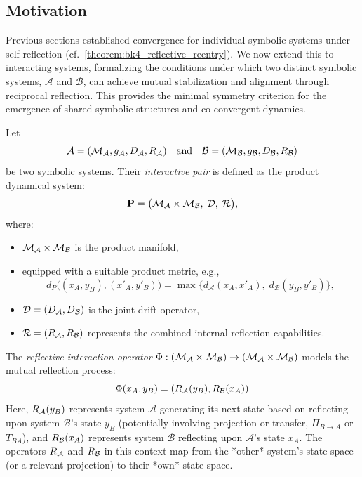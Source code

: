 \subsection{Motivation}
\label{subsec:bk7_motivation}
Previous sections established convergence for individual symbolic systems under self-reflection (cf.~\ref{theorem:bk4_reflective_reentry}). We now extend this to interacting systems, formalizing the conditions under which two distinct symbolic systems, \(\mathcal{A}\) and \(\mathcal{B}\), can achieve mutual stabilization and alignment through reciprocal reflection. This provides the minimal symmetry criterion for the emergence of shared symbolic structures and co-convergent dynamics.
\begin{definition}
\label{definition:bk7_interactive_drift_reflection_pair}
Let
\[
\mathcal{A} = (\mathcal{M}_{\mathcal{A}}, g_{\mathcal{A}}, D_{\mathcal{A}}, R_{\mathcal{A}})
\quad \text{and} \quad
\mathcal{B} = (\mathcal{M}_{\mathcal{B}}, g_{\mathcal{B}}, D_{\mathcal{B}}, R_{\mathcal{B}})
\]
be two symbolic systems.
Their \emph{interactive pair} is defined as the product dynamical system:
\[
\mathbf{P} = \bigl( \mathcal{M}_{\mathcal{A}} \times \mathcal{M}_{\mathcal{B}},\; \mathcal{D},\; \mathcal{R} \bigr),
\]
where:
\begin{itemize}
  \item \( \mathcal{M}_{\mathcal{A}} \times \mathcal{M}_{\mathcal{B}} \) is the product manifold,
  \item equipped with a suitable product metric, e.g.,
  \[
  d_P\big((x_A, y_B), (x'_A, y'_B)\big) 
  = \max\big\{ d_{\mathcal{A}}(x_A, x'_A),\; d_{\mathcal{B}}(y_B, y'_B) \big\},
  \]
  \item \( \mathcal{D} = (D_{\mathcal{A}}, D_{\mathcal{B}}) \) is the joint drift operator,
  \item \( \mathcal{R} = (R_{\mathcal{A}}, R_{\mathcal{B}}) \) represents the combined internal reflection capabilities.
\end{itemize}
\end{definition}
\begin{definition}
\label{definition:bk7_reflective_interaction_operator_}
The \emph{reflective interaction operator} \(\Phi : (\mathcal{M}_{\mathcal{A}}\times\mathcal{M}_{\mathcal{B}}) \to (\mathcal{M}_{\mathcal{A}}\times\mathcal{M}_{\mathcal{B}})\) models the mutual reflection process:
\[
\Phi(x_A, y_B) = (R_{\mathcal{A}}(y_B), R_{\mathcal{B}}(x_A))
\]
Here, \(R_{\mathcal{A}}(y_B)\) represents system \(\mathcal{A}\) generating its next state based on reflecting upon system \(\mathcal{B}\)'s state \(y_B\) (potentially involving projection or transfer, \(\Pi_{B \to A}\) or \(T_{BA}\)), and \(R_{\mathcal{B}}(x_A)\) represents system \(\mathcal{B}\) reflecting upon \(\mathcal{A}\)'s state \(x_A\). The operators \(R_{\mathcal{A}}\) and \(R_{\mathcal{B}}\) in this context map from the *other* system's state space (or a relevant projection) to their *own* state space.
\end{definition}
